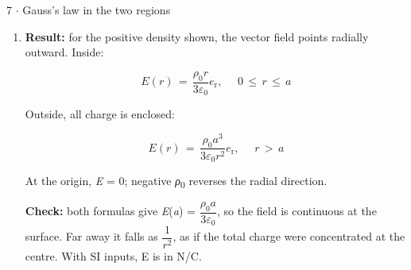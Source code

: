 \documentclass[11pt]{article}
\begin{document}
\begin{keepsection}
\begin{workedbox}{7 \ensuremath{\cdot} Gauss’s law in the two regions}
\begin{enumerate}
\begin{equation*}{Q}_{\text{total}}\, =\, {ρ}_{0}\dfrac{4π{a}^{3}}{3};\, \quad \, {E}_{\mathrm{r}}({r})\, =\, \dfrac{{ρ}_{0}{a}^{3}}{3{ε}_{0}{r}^{2}},\, \quad \, {r}\, >\, {a}\end{equation*}
\item {}
\textbf{Result:} for the positive density shown, the vector field points radially outward. Inside:

\begin{equation*}{E}({r})\, =\, \dfrac{{ρ}_{0}{r}}{3{ε}_{0}}{e}_{\mathrm{r}},\, \quad \, 0\, \leq \, {r}\, \leq \, {a}\end{equation*}

Outside, all charge is enclosed:

\begin{equation*}{E}({r})\, =\, \dfrac{{ρ}_{0}{a}^{3}}{3{ε}_{0}{r}^{2}}{e}_{\mathrm{r}},\, \quad \, {r}\, >\, {a}\end{equation*}

At the origin, \textit{E} = 0; negative \textit{ρ}\textsubscript{0} reverses the radial direction.

\textbf{Check:} both formulas give \textit{E}(\textit{a}) = {\small\ensuremath{\dfrac{{ρ}_{0}{a}}{3{ε}_{0}}}}, so the field is continuous at the surface. Far away it falls as {\small\ensuremath{\dfrac{1}{{r}^{2}}}}, as if the total charge were concentrated at the centre. With SI inputs, E is in N/C.


\end{enumerate}
\end{workedbox}
\end{keepsection}
\end{document}
